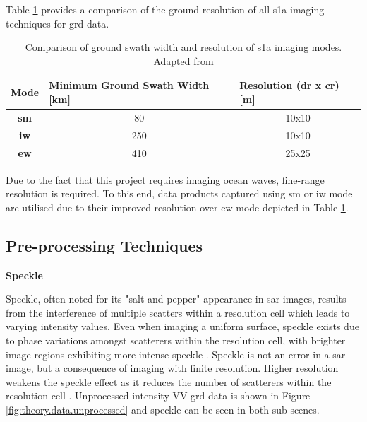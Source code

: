 Table \ref{tab:theory.s1aImagingParams} provides a comparison of the ground resolution of all \acs{s1a} imaging techniques for \acs{grd} data.

\begin{table}[H]
\centering
\begin{tabular}{|c|c|c|}
\hline
\textbf{Mode} & \multicolumn{1}{l|}{\textbf{Minimum Ground Swath Width {[}km{]}}} & \multicolumn{1}{l|}{\textbf{Resolution (dr x cr) {[}m{]}}} \\ \hline
\textbf{\acs{sm}} & 80 & 10x10 \\ \hline
\textbf{\acs{iw}} & 250 & 10x10 \\ \hline
\textbf{\acs{ew}} & 410 & 25x25 \\ \hline
\end{tabular}
\caption{Comparison of ground swath width and resolution of \acs{s1a} imaging modes. Adapted from \cite{sentinel1ProductDef}}
\label{tab:theory.s1aImagingParams}
\end{table}

Due to the fact that this project requires imaging ocean waves, fine-range resolution is required. To this end, data products captured using \acs{sm} or \acs{iw} mode are utilised due to their improved resolution over \acs{ew} mode depicted in Table \ref{tab:theory.s1aImagingParams}.






\subsection{Pre-processing Techniques} \label{subsec:theory.sar.preProcess}

\textbf{Speckle}

Speckle, often noted for its "salt-and-pepper" appearance \cite{Meyer2019} in \acs{sar} images, results from the interference of multiple scatters within a resolution cell which leads to varying intensity values. Even when imaging a uniform surface, speckle exists due to phase variations amongst scatterers within the resolution cell, with brighter image regions exhibiting more intense speckle \cite{Moreira2013,Meyer2019}. Speckle is not an error in a \acs{sar} image, but a consequence of imaging with finite resolution. Higher resolution weakens the speckle effect as it reduces the number of scatterers within the resolution cell \cite{Meyer2019}. Unprocessed intensity VV \acs{grd} data is shown in Figure \ref{fig:theory.data.unprocessed} and speckle can be seen in both sub-scenes.

